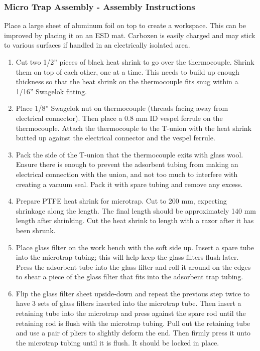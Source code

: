 \subsubsection{Micro Trap Assembly - Assembly Instructions}
Place a large sheet of aluminum foil on top to create a workspace. This can be improved by placing it on an ESD mat. Carboxen is easily charged and may stick to various surfaces if handled in an electrically isolated area.
\begin{enumerate}
\item Cut two 1/2'' pieces of black heat shrink to go over the thermocouple. Shrink them on top of each other, one at a time. This needs to build up enough thickness so that the heat shrink on the thermocouple fits snug within a 1/16'' Swagelok fitting.

\item Place 1/8'' Swagelok nut on thermocouple (threads facing away from electrical connector). Then place a 0.8 mm ID vespel ferrule on the thermocouple. Attach the thermocouple to the T-union with the heat shrink butted up against the electrical connector and the vespel ferrule.

\item Pack the side of the T-union that the thermocouple exits with glass wool. Ensure there is enough to prevent the adsorbent tubing from making an electrical connection with the union, and not too much to interfere with creating a vacuum seal. Pack it with spare tubing and remove any excess.

\item Prepare PTFE heat shrink for microtrap. Cut to 200 mm, expecting shrinkage along the length. The final length should be approximately 140 mm length after shrinking. Cut the heat shrink to length with a razor after it has been shrunk.

\item Place glass filter on the work bench with the soft side up. Insert a spare tube into the microtrap tubing; this will help keep the glass filters flush later. Press the adsorbent tube into the glass filter and roll it around on the edges to shear a piece of the glass filter that fits into the adsorbent trap tubing.

\item Flip the glass filter sheet upside-down and repeat the previous step twice to have 3 sets of glass filters inserted into the microtrap tube. Then insert a retaining tube into the microtrap and press against the spare rod until the retaining rod is flush with the microtrap tubing. Pull out the retaining tube and use a pair of pliers to slightly deform the end. Then firmly press it unto the microtrap tubing until it is flush. It should be locked in place.


\end{enumerate}
